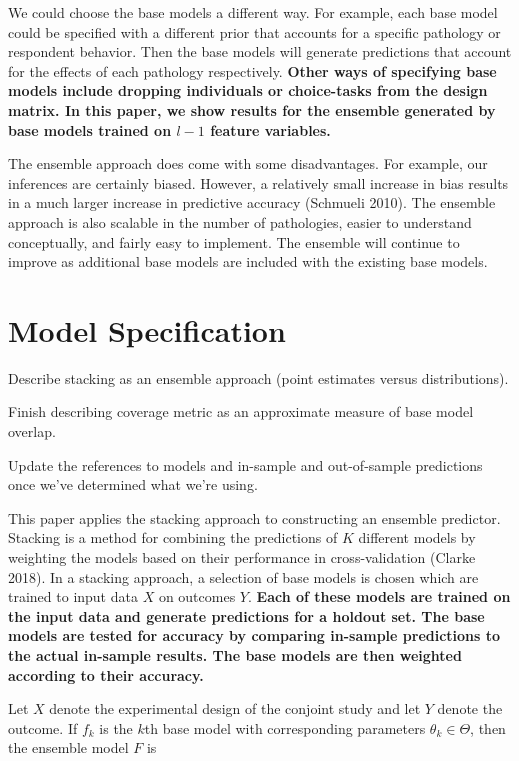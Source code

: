 \documentclass[12pt,titlepage]{mktg-article}
\begin{document}
We could choose the base models a different way. For example, each base model could be specified with a different prior that accounts for a specific pathology or respondent behavior. Then the base models will generate predictions that account for the effects of each pathology respectively. \textbf{Other ways of specifying base models include dropping individuals or choice-tasks from the design matrix. In this paper, we show results for the ensemble generated by base models trained on \(l-1\) feature variables.}

The ensemble approach does come with some disadvantages. For example, our inferences are certainly biased. However, a relatively small increase in bias results in a much larger increase in predictive accuracy (Schmueli 2010). The ensemble approach is also scalable in the number of pathologies, easier to understand conceptually, and fairly easy to implement. The ensemble will continue to improve as additional base models are included with the existing base models.

\hypertarget{model-specification}{%
\section{Model Specification}\label{model-specification}}

Describe stacking as an ensemble approach (point estimates versus distributions).

Finish describing coverage metric as an approximate measure of base model overlap.

Update the references to models and in-sample and out-of-sample predictions once we've determined what we're using.

This paper applies the stacking approach to constructing an ensemble predictor. Stacking is a method for combining the predictions of \(K\) different models by weighting the models based on their performance in cross-validation (Clarke 2018). In a stacking approach, a selection of base models is chosen which are trained to input data \(X\) on outcomes \(Y\). \textbf{Each of these models are trained on the input data and generate predictions for a holdout set. The base models are tested for accuracy by comparing in-sample predictions to the actual in-sample results. The base models are then weighted according to their accuracy.}

Let \(X\) denote the experimental design of the conjoint study and let \(Y\) denote the outcome. If \(f_k\) is the \(k\)th base model with corresponding parameters \(\theta_k \in \Theta\), then the ensemble model \(F\) is
\end{document}
